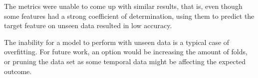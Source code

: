 \documentclass[11pt]{article}
\begin{document}
\label{obs}
The metrics were unable to come up with similar results, that is, even though some features had a strong coefficient of determination, using them to predict the target feature on unseen data resulted in low accuracy.

The inability for a model to perform with unseen data is a typical case of overfitting. For future work, an option would be increasing the amount of folds, or pruning the data set as some temporal data might be affecting the expected outcome.

\FloatBarrier
\nocite{*}



\end{document}
